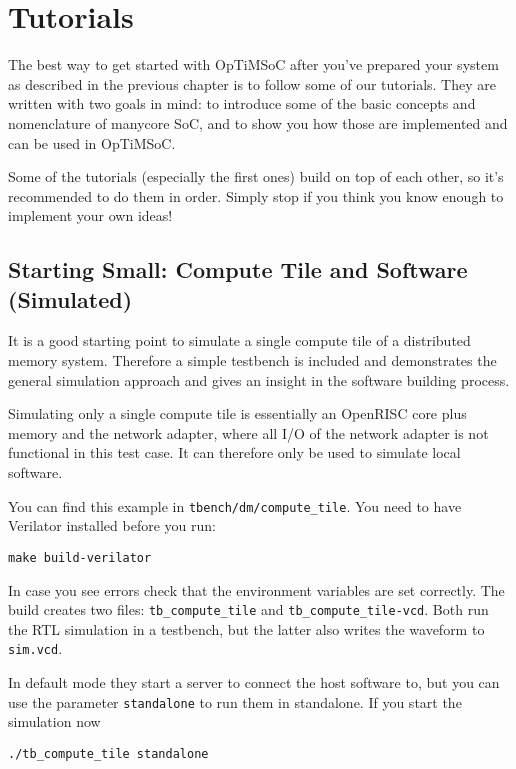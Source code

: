 \chapter{Tutorials}
\label{chap:tutorials}

The best way to get started with OpTiMSoC after you've prepared your
system as described in the previous chapter is to follow some of our
tutorials. They are written with two goals in mind: to introduce some
of the basic concepts and nomenclature of manycore SoC, and to show
you how those are implemented and can be used in OpTiMSoC.

Some of the tutorials (especially the first ones) build on top of each
other, so it's recommended to do them in order. Simply stop if you
think you know enough to implement your own ideas!

\section{Starting Small: Compute Tile and Software (Simulated)}

It is a good starting point to simulate a single compute tile of a
distributed memory system. Therefore a simple testbench is included
and demonstrates the general simulation approach and gives an insight
in the software building process.

Simulating only a single compute tile is essentially an OpenRISC core
plus memory and the network adapter, where all I/O of the network
adapter is not functional in this test case. It can therefore only be
used to simulate local software.

You can find this example in \verb|tbench/dm/compute_tile|. You
need to have Verilator installed before you run:

\begin{lstlisting}
make build-verilator
\end{lstlisting}

In case you see errors check that the environment variables are set
correctly. The build creates two files: \verb|tb_compute_tile| and
\verb|tb_compute_tile-vcd|. Both run the RTL simulation in a testbench,
but the latter also writes the waveform to \verb|sim.vcd|.

In default mode they start a server to connect the host software to,
but you can use the parameter \verb|standalone| to run them in
standalone. If you start the simulation now

\begin{lstlisting}
./tb_compute_tile standalone
\end{lstlisting}

